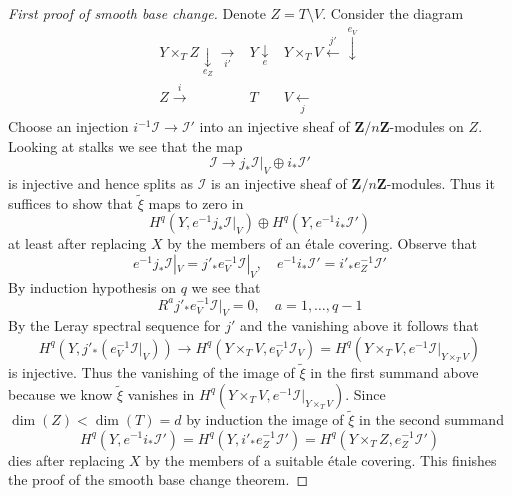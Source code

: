 \begin{proof}[First proof of smooth base change]
\medskip\noindent
Denote $Z = T \setminus V$. Consider the diagram
$$
\begin{array}{ccc}Y \times_T Z \underset{e_Z}{\downarrow}\underset{i'}{\longrightarrow} & Y \underset{e}{\downarrow} & Y \times_T V \overset{j'}{\longleftarrow}\overset{e_V}{\downarrow} \\ Z \overset{i}{\longrightarrow} & T & V \underset{j}{\longleftarrow}\end{array}
$$
Choose an injection $i^{-1}\mathcal{I} \to \mathcal{I}'$
into an injective sheaf of $\mathbf{Z}/n\mathbf{Z}$-modules on $Z$.
Looking at stalks we see that the map
$$
\mathcal{I} \to j_*\mathcal{I}|_V \oplus i_*\mathcal{I}'
$$
is injective and hence splits as $\mathcal{I}$ is an injective sheaf
of $\mathbf{Z}/n\mathbf{Z}$-modules. Thus it suffices to show that
$\tilde \xi$ maps to zero in
$$
H^q(Y, e^{-1}j_*\mathcal{I}|_V) \oplus
H^q(Y, e^{-1}i_*\mathcal{I}')
$$
at least after replacing $X$ by the members of an \'etale covering.
Observe that
$$
e^{-1}j_*\mathcal{I}|_V = j'_*e_V^{-1}\mathcal{I}|_V,\quad
e^{-1}i_*\mathcal{I}' = i'_*e_Z^{-1}\mathcal{I}'
$$
By induction hypothesis on $q$ we see that
$$
R^aj'_*e_V^{-1}\mathcal{I}|_V = 0, \quad a = 1, \ldots, q - 1
$$
By the Leray spectral sequence for $j'$ and the vanishing
above it follows that
$$
H^q(Y, j'_*(e_V^{-1}\mathcal{I}|_V))
\longrightarrow
H^q(Y \times_T V, e_V^{-1}\mathcal{I}_V) =
H^q(Y \times_T V, e^{-1}\mathcal{I}|_{Y \times_T V})
$$
is injective. Thus the vanishing of the image of $\tilde \xi$
in the first summand above because we know $\tilde \xi$ vanishes
in $H^q(Y \times_T V, e^{-1}\mathcal{I}|_{Y \times_T V})$.
Since $\dim(Z) < \dim(T) = d$ by induction the image of $\tilde \xi$
in the second summand
$$
H^q(Y, e^{-1}i_*\mathcal{I}') =
H^q(Y, i'_*e_Z^{-1}\mathcal{I}') =
H^q(Y \times_T Z, e_Z^{-1}\mathcal{I}')
$$
dies after replacing $X$ by the members of a suitable \'etale covering.
This finishes the proof of the smooth base change theorem.
\end{proof}

